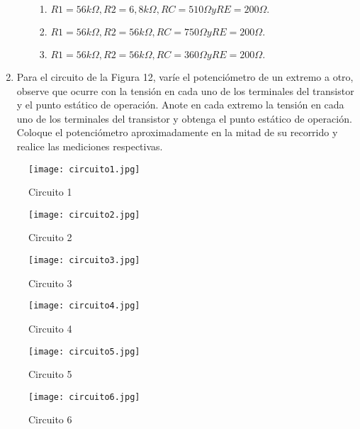 \documentclass[10pt, a4paper]{article}
\begin{document}
\begin{enumerate}
\begin{enumerate}
\begin{enumerate}
                \item $R1=56k\Omega, R2=6,8k\Omega, RC=510\Omega y RE=200\Omega.$
                \item $R1=56k\Omega, R2=56k\Omega, RC=750\Omega y RE=200\Omega.$
                \item $R1=56k\Omega, R2=56k\Omega, RC=360\Omega y RE=200\Omega.$
            \end{enumerate}
        \end{enumerate}
        \item 	Para el circuito de la Figura 12, varíe el potenciómetro de un extremo a otro, observe que ocurre con la tensión en cada uno de los terminales del transistor y el punto estático de operación. Anote en cada extremo la tensión en cada uno de los terminales del transistor y obtenga el punto estático de operación. Coloque el potenciómetro aproximadamente en la mitad de su recorrido y realice las mediciones respectivas.
    \end{enumerate}

    \begin{figure}[h!]
        \centering
        \texttt{[image: circuito1.jpg]}
        \caption{\label{fig:7} Circuito 1}
    \end{figure}

    \begin{figure}[h!]
        \centering
        \texttt{[image: circuito2.jpg]}
        \caption{\label{fig:8} Circuito 2}
    \end{figure}

    \begin{figure}[h!]
        \centering
        \texttt{[image: circuito3.jpg]}
        \caption{\label{fig:9} Circuito 3}
    \end{figure}

    \begin{figure}[h!]
        \centering
        \texttt{[image: circuito4.jpg]}
        \caption{\label{fig:10} Circuito 4}
    \end{figure}

    \begin{figure}[h!]
        \centering
        \texttt{[image: circuito5.jpg]}
        \caption{\label{fig:11} Circuito 5}
    \end{figure}

    \begin{figure}[h!]
        \centering
        \texttt{[image: circuito6.jpg]}
        \caption{\label{fig:12} Circuito 6}
    \end{figure}
\end{document}
